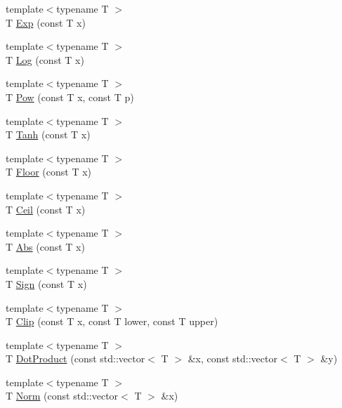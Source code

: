 \begin{DoxyCompactItemize}
{\footnotesize template$<$typename T $>$ }\\T \hyperlink{namespace_c_o_n_t_r_a_l_i_g_n_a5ca67d3de567a8e208454433fc9b3985}{Exp} (const T x)
\item 
{\footnotesize template$<$typename T $>$ }\\T \hyperlink{namespace_c_o_n_t_r_a_l_i_g_n_a4bfa0bc3748b3484f0a9e0d9bb5a62fa}{Log} (const T x)
\item 
{\footnotesize template$<$typename T $>$ }\\T \hyperlink{namespace_c_o_n_t_r_a_l_i_g_n_a2c8a2f8551093619bdb7afa60d34db78}{Pow} (const T x, const T p)
\item 
{\footnotesize template$<$typename T $>$ }\\T \hyperlink{namespace_c_o_n_t_r_a_l_i_g_n_a054e3c2a248dca86c547d357c0063808}{Tanh} (const T x)
\item 
{\footnotesize template$<$typename T $>$ }\\T \hyperlink{namespace_c_o_n_t_r_a_l_i_g_n_a8eab454f786925da404894d345c55572}{Floor} (const T x)
\item 
{\footnotesize template$<$typename T $>$ }\\T \hyperlink{namespace_c_o_n_t_r_a_l_i_g_n_a71287d09e3234f79f410137964df4d2f}{Ceil} (const T x)
\item 
{\footnotesize template$<$typename T $>$ }\\T \hyperlink{namespace_c_o_n_t_r_a_l_i_g_n_ac6566074a120c798141a91753c50290f}{Abs} (const T x)
\item 
{\footnotesize template$<$typename T $>$ }\\T \hyperlink{namespace_c_o_n_t_r_a_l_i_g_n_aa4f87aa569c6cb44a0e15a73cc475c13}{Sign} (const T x)
\item 
{\footnotesize template$<$typename T $>$ }\\T \hyperlink{namespace_c_o_n_t_r_a_l_i_g_n_a469955594da581dc70e2bafc9f235680}{Clip} (const T x, const T lower, const T upper)
\item 
{\footnotesize template$<$typename T $>$ }\\T \hyperlink{namespace_c_o_n_t_r_a_l_i_g_n_a060f37f304d3b409ad044d105b37c4af}{Dot\+Product} (const std\+::vector$<$ T $>$ \&x, const std\+::vector$<$ T $>$ \&y)
\item 
{\footnotesize template$<$typename T $>$ }\\T \hyperlink{namespace_c_o_n_t_r_a_l_i_g_n_aea939de28045df5b9199ff4bf6a93b49}{Norm} (const std\+::vector$<$ T $>$ \&x)
\item 

\end{DoxyCompactItemize}
